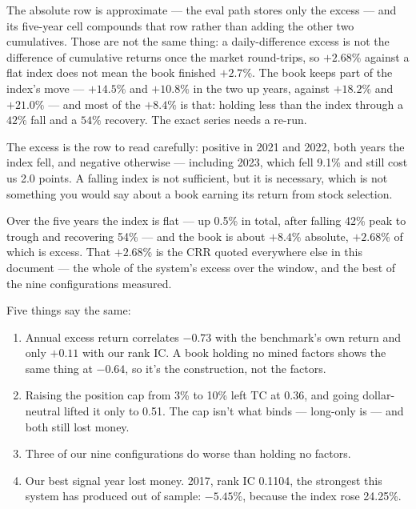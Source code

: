 \documentclass[11pt]{article}
\begin{document}
The absolute row is approximate --- the eval path stores only the excess --- and its
five-year cell compounds that row rather than adding the other two cumulatives. Those are
not the same thing: a daily-difference excess is not the difference of cumulative returns
once the market round-trips, so $+2.68\%$ against a flat index does not mean the book
finished $+2.7\%$. The book keeps part of the index's move --- $+14.5\%$ and $+10.8\%$ in
the two up years, against $+18.2\%$ and $+21.0\%$ --- and most of the $+8.4\%$ is that:
holding less than the index through a $42\%$ fall and a $54\%$ recovery. The exact series
needs a re-run.

The excess is the row to read carefully: positive in 2021 and 2022, both years the index
fell, and negative otherwise --- including 2023, which fell 9.1\% and still cost us 2.0
points. A falling index is not sufficient, but it is necessary, which is not something
you would say about a book earning its return from stock selection.

Over the five years the index is flat --- up 0.5\% in total, after falling 42\% peak to
trough and recovering 54\% --- and the book is about $+8.4\%$ absolute, $\bm{+2.68\%}$ of
which is excess. That $+2.68\%$ is the CRR quoted everywhere else in this document --- the
whole of the system's excess over the window, and the best of the nine configurations
measured.

Five things say the same:

\begin{enumerate}[leftmargin=*,itemsep=1pt]
\item Annual excess return correlates $-0.73$ with the benchmark's own return and
only $+0.11$ with our rank IC. A book holding no mined factors shows the same thing
at $-0.64$, so it's the construction, not the factors.
\item Raising the position cap from 3\% to 10\% left TC at 0.36, and going
dollar-neutral lifted it only to 0.51. The cap isn't what binds --- long-only is ---
and both still lost money.
\item Three of our nine configurations do worse than holding no factors.
\item Our best signal year lost money. 2017, rank IC 0.1104, the strongest this
system has produced out of sample: $-5.45\%$, because the index rose 24.25\%.
\end{enumerate}
\end{document}
